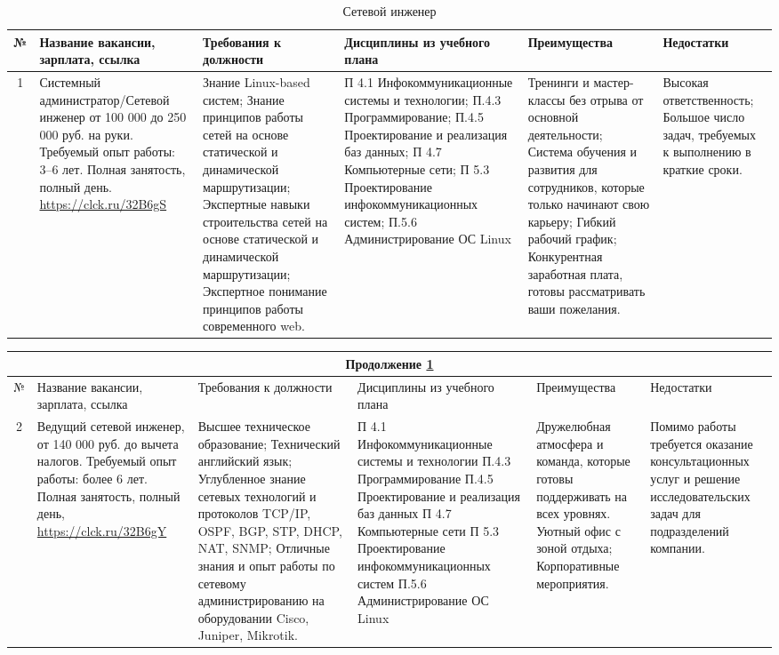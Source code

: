 \documentclass[14pt]{extreport}
\begin{document}
\begin{landscape}
\begin{table}[H]
\caption{Сетевой инженер}
\label{tab_provider}
	\begin{tabular}{|c|p{3.3cm}|p{6cm}|p{4.7cm}|p{5.5cm}|p{3.5cm}|}
	\hline № & {Название вакансии, зарплата, ссылка} & {Требования к должности} & {Дисциплины из учебного плана} & {Преимущества} & {Недостатки} \\
	\hline 1 & {Системный администратор/Сетевой инженер от 100 000 до 250 000 руб. на руки. Требуемый опыт работы: 3–6 лет. Полная занятость, полный день. \url{https://clck.ru/32B6gS}} & {Знание Linux-based систем;
Знание принципов работы сетей на основе статической и динамической маршрутизации;
Экспертные навыки строительства сетей на основе статической и динамической маршрутизации;
Экспертное понимание принципов работы современного web.} & {П 4.1 Инфокоммуникационные системы и технологии; П.4.3 Программирование; П.4.5 Проектирование и реализация баз данных; П 4.7 Компьютерные сети; П 5.3 Проектирование инфокоммуникационных систем; П.5.6 Администрирование ОС Linux} & {Тренинги и мастер-классы без отрыва от основной деятельности; Система обучения и развития для сотрудников, которые только начинают свою карьеру; Гибкий рабочий график; Конкурентная заработная плата, готовы рассматривать ваши пожелания.} & {Высокая ответственность; Большое число задач, требуемых к выполнению в краткие сроки.} \\
	\hline
	\end{tabular}
\end{table}

\begin{table}[H]
	\begin{tabular}{|c|p{3.3cm}|p{6cm}|p{4.7cm}|p{5.5cm}|p{3.5cm}|}
	\multicolumn{6}{c}{Продолжение \ref{tab_provider}} \\
	\hline № & {Название вакансии, зарплата, ссылка} & {Требования к должности} & {Дисциплины из учебного плана} & {Преимущества} & {Недостатки} \\
 	\hline 2 & {Ведущий сетевой инженер,
от 140 000 руб. до вычета налогов.
Требуемый опыт работы: более 6 лет.
Полная занятость, полный день, \url{https://clck.ru/32B6gY}} & {Высшее техническое образование; Технический английский язык; Углубленное знание сетевых технологий и протоколов TCP/IP, OSPF, BGP, STP, DHCP, NAT, SNMP; Отличные знания и опыт работы по сетевому администрированию на оборудовании Cisco, Juniper, Mikrotik.} & {П 4.1 Инфокоммуникационные системы и технологии
П.4.3 Программирование
П.4.5 Проектирование и реализация баз данных
П 4.7 Компьютерные сети
П 5.3 Проектирование инфокоммуникационных систем
П.5.6 Администрирование ОС Linux} & {Дружелюбная атмосфера и команда, которые готовы поддерживать на всех уровнях.
Уютный офис с зоной отдыха;
Корпоративные мероприятия.} & {Помимо работы требуется оказание консультационных услуг и решение исследовательских задач для подразделений компании.} \\
	\hline
	\end{tabular}
\end{table}


\end{landscape}
\end{document}
